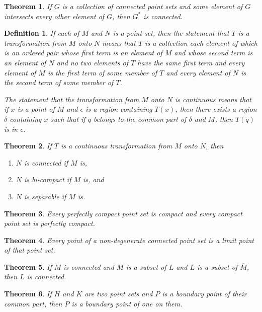 \documentclass[10pt]{report}
\newtheorem{theorem}{Theorem}
\newtheorem{definition}{Definition}
\newcommand{\cl}[1]{\overline{#1}}
\begin{document}
\begin{theorem}
 If $G$ is a collection of connected point sets and some element of $G$ intersects every other element of $G$, then
$G^*$
is connected.
\end{theorem}

\begin{definition}
 If each of $M$ and $N$ is a point set, then the statement that $T$ is a transformation from $M$ onto $N$ means that $T$
is a collection each element of which is an ordered pair whose first term is an element of $M$ and whose second term is
an element of $N$ and no two elements of $T$ have the same first term and every element of $M$ is the first term of some
member of $T$ and every element of $N$ is the second term of some member of $T$.

The statement that the transformation from $M$ onto $N$ is continuous means that if $x$ is a point of $M$ and $\epsilon$
is a region containing $T(x)$, then there exists a region $\delta$ containing $x$ such that if $q$ belongs to the common
part of $\delta$ and $M$, then $T(q)$ is in $\epsilon$.
\end{definition}

\begin{theorem}
 If $T$ is a continuous transformation from $M$ onto $N$, then
\begin{enumerate}
 \item[(1)] $N$ is connected if $M$ is,
 \item[(2)] $N$ is bi-compact if $M$ is, and
 \item[(3)] $N$ is separable if $M$ is.
\end{enumerate}
\end{theorem}

\begin{theorem}
Every perfectly compact point set is compact and every compact point set is perfectly compact.
\end{theorem}

\begin{theorem}
 Every point of a non-degenerate connected point set is a limit point of that point set.
\end{theorem}

\begin{theorem}
 If $M$ is connected and $M$ is a subset of $L$ and $L$ is a subset of $\cl{M}$, then $L$ is connected.
\end{theorem}

\begin{theorem}
 If $H$ and $K$ are two point sets and $P$ is a boundary point of their common part, then $P$ is a boundary point of one
on them.
\end{theorem}
\end{document}

